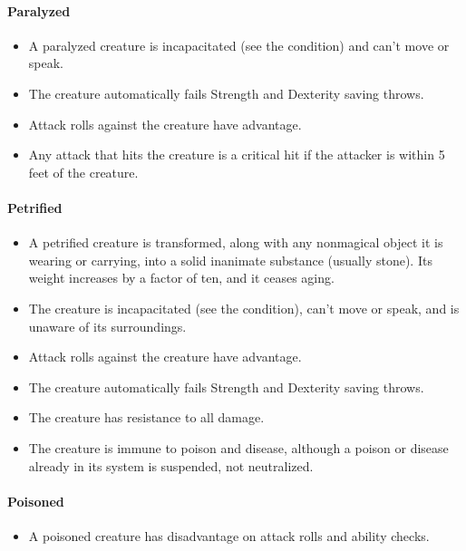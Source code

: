 \documentclass[
]{article}
\providecommand{\tightlist}{%
  \setlength{\itemsep}{0pt}\setlength{\parskip}{0pt}}
\begin{document}
\hypertarget{paralyzed}{%
\paragraph{Paralyzed}\label{paralyzed}}

\begin{itemize}
\tightlist
\item
  A paralyzed creature is incapacitated (see the condition) and can't
  move or speak.
\item
  The creature automatically fails Strength and Dexterity saving throws.
\item
  Attack rolls against the creature have advantage.
\item
  Any attack that hits the creature is a critical hit if the attacker is
  within 5 feet of the creature.
\end{itemize}

\hypertarget{petrified}{%
\paragraph{Petrified}\label{petrified}}

\begin{itemize}
\tightlist
\item
  A petrified creature is transformed, along with any nonmagical object
  it is wearing or carrying, into a solid inanimate substance (usually
  stone). Its weight increases by a factor of ten, and it ceases aging.
\item
  The creature is incapacitated (see the condition), can't move or
  speak, and is unaware of its surroundings.
\item
  Attack rolls against the creature have advantage.
\item
  The creature automatically fails Strength and Dexterity saving throws.
\item
  The creature has resistance to all damage.
\item
  The creature is immune to poison and disease, although a poison or
  disease already in its system is suspended, not neutralized.
\end{itemize}

\hypertarget{poisoned}{%
\paragraph{Poisoned}\label{poisoned}}

\begin{itemize}
\tightlist
\item
  A poisoned creature has disadvantage on attack rolls and ability
  checks.
\end{itemize}
\end{document}
